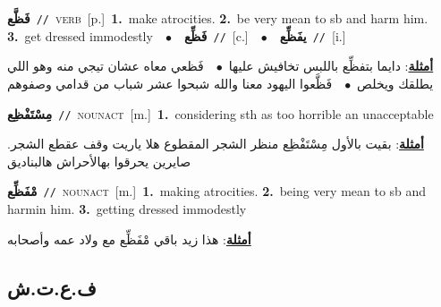 \documentclass[10pt,a4paper,twoside]{article} %
\begin{document}
\begin{multicols}{2}
{\setlength\topsep{0pt}\textbf{\foreignlanguage{arabic}{فَظَّع}}\ {\color{gray}\texttt{//}\color{black}}\ \textsc{verb}\ [p.]\ \textbf{1.}~make atrocities.  \textbf{2.}~be very mean to sb and harm him.  \textbf{3.}~get dressed immodestly\ \ $\bullet$\ \ \setlength\topsep{0pt}\textbf{\foreignlanguage{arabic}{فَظِّع}}\ {\color{gray}\texttt{//}\color{black}}\ [c.]\ \ $\bullet$\ \ \setlength\topsep{0pt}\textbf{\foreignlanguage{arabic}{يفَظِّع}}\ {\color{gray}\texttt{//}\color{black}}\ [i.]\  \begin{flushright}\color{gray}\foreignlanguage{arabic}{\textbf{\underline{\foreignlanguage{arabic}{أمثلة}}}: دايما بتفظِّع باللبس تخافيش عليها\ $\bullet$\ \  فَظعي معاه عشان تيجي منه وهو اللي يطلقك ويخلص\ $\bullet$\ \  فَظَّعوا اليهود معنا والله شبحوا عشر شباب من قدامي وصفوهم}\end{flushright}\color{black}} \vspace{2mm}

{\setlength\topsep{0pt}\textbf{\foreignlanguage{arabic}{مِسْتَفْظِع}}\ {\color{gray}\texttt{//}\color{black}}\ \textsc{noun\textunderscore act}\ [m.]\ \textbf{1.}~considering sth as too horrible an unacceptable\  \begin{flushright}\color{gray}\foreignlanguage{arabic}{\textbf{\underline{\foreignlanguage{arabic}{أمثلة}}}: بقيت بالأول مِسْتَفْظِع منظر الشجر المقطوع هلا ياريت وقف عقطع الشجر. صايرين يحرقوا بهالأحراش هالبناديق}\end{flushright}\color{black}} \vspace{2mm}

{\setlength\topsep{0pt}\textbf{\foreignlanguage{arabic}{مْفَظِّع}}\ {\color{gray}\texttt{//}\color{black}}\ \textsc{noun\textunderscore act}\ [m.]\ \textbf{1.}~making atrocities.  \textbf{2.}~being very mean to sb and harmin him.  \textbf{3.}~getting dressed immodestly\  \begin{flushright}\color{gray}\foreignlanguage{arabic}{\textbf{\underline{\foreignlanguage{arabic}{أمثلة}}}: هذا زيد باقي مْفَظِّع مع ولاد عمه وأصحابه}\end{flushright}\color{black}} \vspace{2mm}

\vspace{-3mm}
\subsection*{\color{blue}\foreignlanguage{arabic}{ف.ع.ت.ش}\color{blue}{}} 


\end{multicols}
\end{document}
